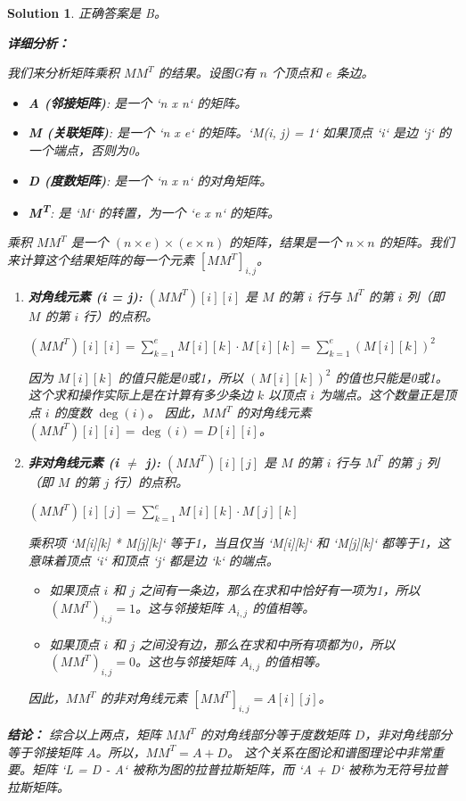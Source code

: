 \documentclass[UTF8]{report}
\newtheorem{solution}{Solution}
\theoremstyle{MyLineTheoremStyle} %
\theoremstyle{MyBlockTheoremStyle} %
\theoremstyle{MySubsubsectionStyle} %
\begin{document}
\begin{solution}
正确答案是 B。

\textbf{详细分析：}

我们来分析矩阵乘积 $MM^T$ 的结果。设图G有 $n$ 个顶点和 $e$ 条边。
\begin{itemize}
    \item \textbf{A (邻接矩阵)}: 是一个 `n x n` 的矩阵。
    \item \textbf{M (关联矩阵)}: 是一个 `n x e` 的矩阵。`M(i, j) = 1` 如果顶点 `i` 是边 `j` 的一个端点，否则为0。
    \item \textbf{D (度数矩阵)}: 是一个 `n x n` 的对角矩阵。
    \item \textbf{M\textsuperscript{T}}: 是 `M` 的转置，为一个 `e x n` 的矩阵。
\end{itemize}

乘积 $MM^T$ 是一个 $(n \times e) \times (e \times n)$ 的矩阵，结果是一个 $n \times n$ 的矩阵。我们来计算这个结果矩阵的每一个元素 $[MM^T]_{i,j}$。

\begin{enumerate}
    \item \textbf{对角线元素 (i = j):}
    $(MM^T)[i][i]$ 是 $M$ 的第 $i$ 行与 $M^T$ 的第 $i$ 列（即 $M$ 的第 $i$ 行）的点积。
    \begin{center}
    $(MM^T)[i][i] = \sum_{k=1}^{e} M[i][k] \cdot M[i][k] = \sum_{k=1}^{e} (M[i][k])^2$
    \end{center}
    因为 $M[i][k]$ 的值只能是0或1，所以 $(M[i][k])^2$ 的值也只能是0或1。这个求和操作实际上是在计算有多少条边 $k$ 以顶点 $i$ 为端点。这个数量正是顶点 $i$ 的度数 $\deg(i)$。
    因此，$MM^T$ 的对角线元素 $(MM^T)[i][i] = \deg(i) = D[i][i]$。

    \item \textbf{非对角线元素 (i $\neq$ j):}
    $(MM^T)[i][j]$ 是 $M$ 的第 $i$ 行与 $M^T$ 的第 $j$ 列（即 $M$ 的第 $j$ 行）的点积。
    \begin{center}
    $(MM^T)[i][j] = \sum_{k=1}^{e} M[i][k] \cdot M[j][k]$
    \end{center}
    乘积项 `M[i][k] * M[j][k]` 等于1，当且仅当 `M[i][k]` 和 `M[j][k]` 都等于1，这意味着顶点 `i` 和顶点 `j` 都是边 `k` 的端点。
    \begin{itemize}
        \item 如果顶点 $i$ 和 $j$ 之间有一条边，那么在求和中恰好有一项为1，所以 $(MM^T)_{i,j} = 1$。这与邻接矩阵 $A_{i,j}$ 的值相等。
        \item 如果顶点 $i$ 和 $j$ 之间没有边，那么在求和中所有项都为0，所以 $(MM^T)_{i,j} = 0$。这也与邻接矩阵 $A_{i,j}$ 的值相等。
    \end{itemize}
    因此，$MM^T$ 的非对角线元素 $[MM^T]_{i,j} = A[i][j]$。
\end{enumerate}

\textbf{结论：}
综合以上两点，矩阵 $MM^T$ 的对角线部分等于度数矩阵 $D$，非对角线部分等于邻接矩阵 $A$。所以，$MM^T = A + D$。
这个关系在图论和谱图理论中非常重要。矩阵 `L = D - A` 被称为图的拉普拉斯矩阵，而 `A + D` 被称为无符号拉普拉斯矩阵。
\end{solution}
\end{document}
